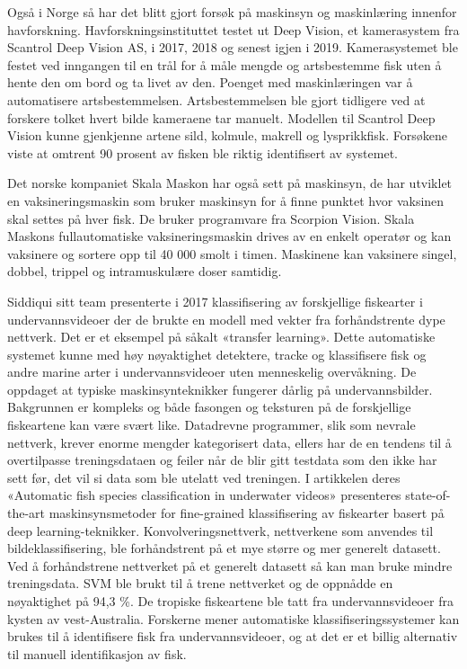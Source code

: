 Også i Norge så har det blitt gjort forsøk på maskinsyn og maskinlæring innenfor havforskning. Havforskningsinstituttet testet ut Deep Vision, et kamerasystem fra Scantrol Deep Vision AS, i 2017, 2018 og senest igjen i 2019. Kamerasystemet ble festet ved inngangen til en trål for å måle mengde og artsbestemme fisk uten å hente den om bord og ta livet av den. Poenget med maskinlæringen var å automatisere artsbestemmelsen. Artsbestemmelsen ble gjort tidligere ved at forskere tolket hvert bilde kameraene tar manuelt. Modellen til Scantrol Deep Vision kunne gjenkjenne artene sild, kolmule, makrell og lysprikkfisk. Forsøkene viste at omtrent 90 prosent av fisken ble riktig identifisert av systemet. \cite{Fenstad 2019}

Det norske kompaniet Skala Maskon har også sett på maskinsyn, de har utviklet en vaksineringsmaskin som bruker maskinsyn for å finne punktet hvor vaksinen skal settes på hver fisk. De bruker programvare fra Scorpion Vision. Skala Maskons fullautomatiske vaksineringsmaskin drives av en enkelt operatør og kan vaksinere og sortere opp til 40 000 smolt i timen. Maskinene kan vaksinere singel, dobbel, trippel og intramuskulære doser samtidig. \cite{Falstad 2016}

Siddiqui sitt team presenterte i 2017 klassifisering av forskjellige fiskearter i undervannsvideoer der de brukte en modell med vekter fra forhåndstrente dype nettverk. Det er et eksempel på såkalt «transfer learning». Dette automatiske systemet kunne med høy nøyaktighet detektere, tracke og klassifisere fisk og andre marine arter i undervannsvideoer uten menneskelig overvåkning. De oppdaget at typiske maskinsynteknikker fungerer dårlig på undervannsbilder. Bakgrunnen er kompleks og både fasongen og teksturen på de forskjellige fiskeartene kan være svært like. Datadrevne programmer, slik som nevrale nettverk, krever enorme mengder kategorisert data, ellers har de en tendens til å overtilpasse treningsdataen og feiler når de blir gitt testdata som den ikke har sett før, det vil si data som ble utelatt ved treningen. I artikkelen deres  «Automatic fish species classification in underwater videos» presenteres state-of-the-art maskinsynsmetoder for fine-grained klassifisering av fiskearter basert på deep learning-teknikker. Konvolveringsnettverk, nettverkene som anvendes til bildeklassifisering, ble forhåndstrent på et mye større og mer generelt datasett. Ved å forhåndstrene nettverket på et generelt datasett så kan man bruke mindre treningsdata. SVM ble brukt til å trene nettverket og de oppnådde en nøyaktighet på 94,3 \%. De tropiske fiskeartene ble tatt fra undervannsvideoer fra kysten av vest-Australia. Forskerne mener automatiske klassifiseringssystemer kan brukes til å identifisere fisk fra undervannsvideoer, og at det er et billig alternativ til manuell identifikasjon av fisk. \cite{Siddiqui m.fl. 2017}


